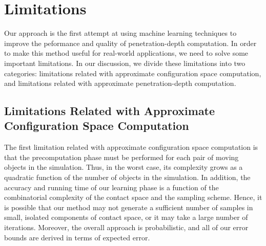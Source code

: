 \section{Limitations}
Our approach is the first attempt at using machine learning techniques to improve the peformance and quality of penetration-depth computation. In order to make this method useful for real-world applications, we need to solve some important limitations. In our discussion, we divide these limitations into two categories: limitations related with approximate configuration space computation, and limitations related with approximate penetration-depth computation.

\subsection{Limitations Related with Approximate Configuration Space Computation}
The first limitation related with approximate configuration space computation is that the precomputation phase must be performed for each pair of moving objects in the simulation. Thus, in the worst case, its complexity grows as a quadratic function of the number of objects in the simulation. In addition, the accuracy and running time of our learning phase is a function of the combinatorial complexity of the contact
space and the sampling scheme. Hence, it is possible that our method may not generate a sufficient number of samples in small,
isolated components of contact space, or it may take a large number of iterations.
Moreover, the overall approach is probabilistic, and all of our error bounds are derived in terms of expected error.

